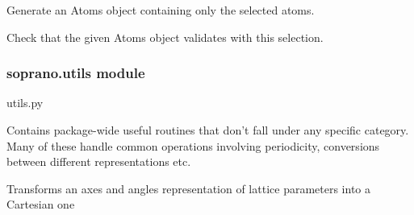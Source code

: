 \documentclass[letterpaper,10pt,english]{sphinxmanual}
\begin{document}
\begin{fulllineitems}
\begin{fulllineitems}
\end{fulllineitems}


\begin{fulllineitems}
\label{doctree/soprano.selection:soprano.selection.AtomSelection.subset}
Generate an Atoms object containing only the selected atoms.

\end{fulllineitems}


\begin{fulllineitems}
\label{doctree/soprano.selection:soprano.selection.AtomSelection.validate}
Check that the given Atoms object validates with this selection.

\end{fulllineitems}


\end{fulllineitems}



\subsubsection{soprano.utils module}
\label{doctree/soprano.utils:soprano-utils-module}\label{doctree/soprano.utils:module-soprano.utils}\label{doctree/soprano.utils::doc}
utils.py

Contains package-wide useful routines that don't fall under any specific
category. Many of these handle common operations involving periodicity,
conversions between different representations etc.

\begin{fulllineitems}
\label{doctree/soprano.utils:soprano.utils.abc2cart}
Transforms an axes and angles representation of lattice parameters
into a Cartesian one

\end{fulllineitems}

\end{document}
